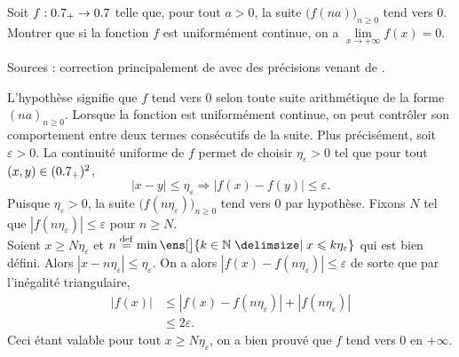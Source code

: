 
\begin{lemme}
    Soit $f : 0.7_+ \to 0.7$ telle que, pour tout $a > 0$, la suite $\big(f(na) \big)_{n \geqslant 0}$ tend vers 0. \\
    Montrer que si la fonction $f$ est uniformément continue, on a $\lim\limits_{x \to + \infty} f(x) = 0$.
\end{lemme}

Sources : correction principalement de \cite{oraux_x_ens_3} avec des précisions venant de \cite{exos_oraux}.

\begin{preuve}
    L'hypothèse signifie que $f$ tend vers $0$ selon toute suite arithmétique de la forme $(na)_{n \geqslant 0}$. Lorsque la fonction est uniformément continue, on peut contrôler son comportement entre deux termes consécutifs de la suite. Plus précisément, soit $\varepsilon > 0$. La continuité uniforme de $f$ permet de choisir $\eta_\varepsilon > 0$ tel que pour tout $(x, y) \in (0.7_+)^2$, 
    $$|x-y| \leqslant \eta_\varepsilon \Rightarrow |f(x) - f(y)| \leqslant \varepsilon.$$
    Puisque $\eta_\varepsilon > 0$, la suite $\big(f(n\eta_\varepsilon)\big)_{n \geqslant 0}$ tend vers $0$ par hypothèse. Fixons $N$ tel que $|f(n \eta_\varepsilon)| \leqslant \varepsilon$ pour $n \geqslant N$. \\
    Soient $x \geqslant N \eta_\varepsilon$ et $n \defeq \min\ens[\big]{ k \in \N \tq x \leqslant k \eta_\varepsilon }$ qui est bien défini. Alors $|x-n\eta_\varepsilon| \leqslant \eta_\varepsilon$. On a alors $|f(x) - f(n \eta_\varepsilon)| \leqslant \varepsilon$ de sorte que par l'inégalité triangulaire, 
    \begin{align*}
        |f(x)| &\leqslant |f(x) - f(n \eta_\varepsilon)| + |f(n \eta_\varepsilon)| \\
        &\leqslant 2 \varepsilon.
    \end{align*}
    Ceci étant valable pour tout $x \geqslant N \eta_\varepsilon$, on a bien prouvé que $f$ tend vers $0$ en $+ \infty$.
\end{preuve}  

\begin{marginfigure}[-3cm]
    
\end{marginfigure}
